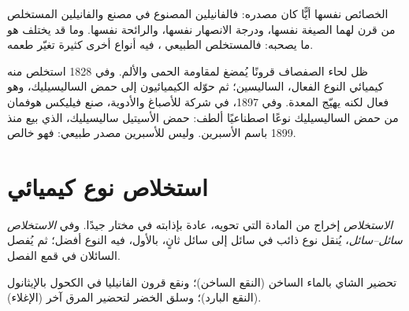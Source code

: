 \begin{proposition}\label{prop:g10:chemical-species:same}
 الخصائص نفسها أيًّا كان مصدره: فالفانيلين المصنوع في مصنع
والفانيلين المستخلص من قرن لهما الصيغة نفسها، ودرجة الانصهار نفسها، والرائحة
نفسها. وما قد يختلف هو ما يصحبه: فالمستخلص الطبيعي ، فيه أنواع أخرى
كثيرة تغيّر طعمه.
\end{proposition}

\begin{history}
ظل لحاء الصفصاف قرونًا يُمضغ لمقاومة الحمى والألم. وفي 1828 استخلص منه
كيميائي النوع الفعال، الساليسين؛ ثم حوّله الكيميائيون إلى حمض الساليسيليك،
وهو فعال لكنه يهيّج المعدة. وفي 1897، في شركة للأصباغ والأدوية، صنع فيليكس
هوفمان من حمض الساليسيليك نوعًا اصطناعيًا ألطف: حمض الأسيتيل ساليسيليك،
الذي بيع منذ 1899 باسم الأسبرين. وليس للأسبرين مصدر طبيعي: فهو 
خالص.
\end{history}

\section{استخلاص نوع كيميائي}

\begin{definition}\label{def:g10:chemical-species:extraction}
\emph{الاستخلاص} إخراج  من المادة التي تحويه،
عادة بإذابته في  مختار جيدًا. وفي
\emph{الاستخلاص سائل--سائل}، يُنقل نوع ذائب في
سائل إلى سائل ثانٍ،  بالأول،  فيه النوع أفضل؛ ثم يُفصل
السائلان في قمع الفصل.
\end{definition}

\begin{example}\label{ex:g10:chemical-species:everyday}
تحضير الشاي  بالماء الساخن (النقع الساخن)؛ ونقع قرون الفانيليا في
الكحول  بالإيثانول (النقع البارد)؛ وسلق الخضر لتحضير المرق 
آخر (الإغلاء).
\end{example}


